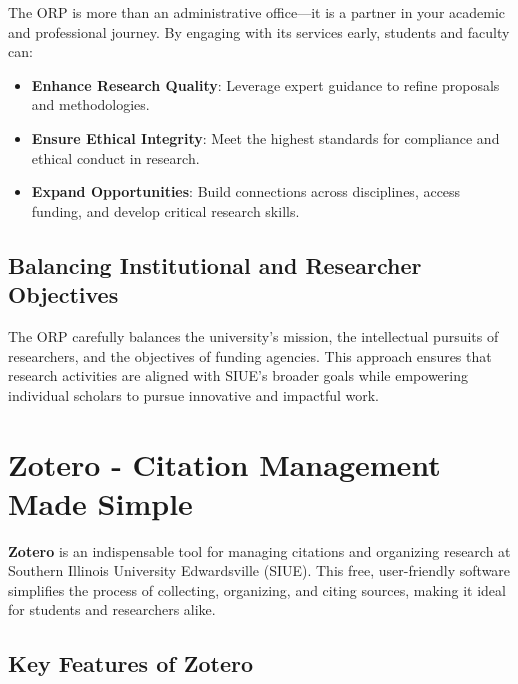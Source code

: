 \documentclass[
]{book}
\providecommand{\tightlist}{%
  \setlength{\itemsep}{0pt}\setlength{\parskip}{0pt}}
\begin{document}
The ORP is more than an administrative office---it is a partner in your academic and professional journey. By engaging with its services early, students and faculty can:

\begin{itemize}
\tightlist
\item
  \textbf{Enhance Research Quality}: Leverage expert guidance to refine proposals and methodologies.
\item
  \textbf{Ensure Ethical Integrity}: Meet the highest standards for compliance and ethical conduct in research.
\item
  \textbf{Expand Opportunities}: Build connections across disciplines, access funding, and develop critical research skills.
\end{itemize}

\subsection*{Balancing Institutional and Researcher Objectives}\label{balancing-institutional-and-researcher-objectives}

The ORP carefully balances the university's mission, the intellectual pursuits of researchers, and the objectives of funding agencies. This approach ensures that research activities are aligned with SIUE's broader goals while empowering individual scholars to pursue innovative and impactful work.

\section{Zotero - Citation Management Made Simple}\label{zotero---citation-management-made-simple}

\textbf{Zotero} is an indispensable tool for managing citations and organizing research at Southern Illinois University Edwardsville (SIUE). This free, user-friendly software simplifies the process of collecting, organizing, and citing sources, making it ideal for students and researchers alike.

\subsection*{Key Features of Zotero}\label{key-features-of-zotero}
\end{document}
